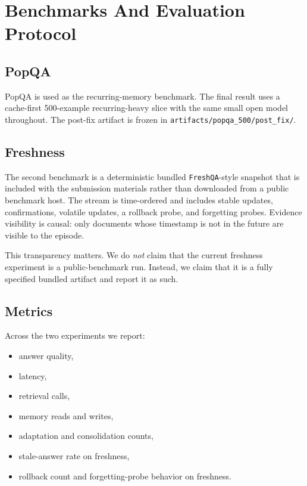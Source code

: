 \section{Benchmarks And Evaluation Protocol}

\subsection{PopQA}
PopQA is used as the recurring-memory benchmark. The final result uses a cache-first 500-example recurring-heavy slice with the same small open model throughout. The post-fix artifact is frozen in \texttt{artifacts/popqa\_500/post\_fix/}.

\subsection{Freshness}
The second benchmark is a deterministic bundled \texttt{FreshQA}-style snapshot that is included with the submission materials rather than downloaded from a public benchmark host. The stream is time-ordered and includes stable updates, confirmations, volatile updates, a rollback probe, and forgetting probes. Evidence visibility is causal: only documents whose timestamp is not in the future are visible to the episode.

This transparency matters. We do \emph{not} claim that the current freshness experiment is a public-benchmark run. Instead, we claim that it is a fully specified bundled artifact and report it as such.

\subsection{Metrics}
Across the two experiments we report:
\begin{itemize}[leftmargin=1.5em]
\item answer quality,
\item latency,
\item retrieval calls,
\item memory reads and writes,
\item adaptation and consolidation counts,
\item stale-answer rate on freshness,
\item rollback count and forgetting-probe behavior on freshness.
\end{itemize}
